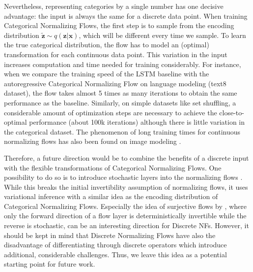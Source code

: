 Nevertheless, representing categories by a single number has one decisive advantage: the input is always the same for a discrete data point.
When training Categorical Normalizing Flows, the first step is to sample from the encoding distribution $\tilde{\bm{z}}\sim q(\bm{z}|\bm{x})$, which will be different every time we sample.
To learn the true categorical distribution, the flow has to model an (optimal) transformation for each continuous data point. 
This variation in the input increases computation and time needed for training considerably.
For instance, when we compare the training speed of the LSTM baseline with the autoregressive Categorical Normalizing Flow on language modeling (text8 dataset), the flow takes almost 5 times as many iterations to obtain the same performance as the baseline.
Similarly, on simple datasets like set shuffling, a considerable amount of optimization steps are necessary to achieve the close-to-optimal performance (about 100k iterations) although there is little variation in the categorical dataset. 
The phenomenon of long training times for continuous normalizing flows has also been found on image modeling \cite{VFlow, Flow++}.

Therefore, a future direction would be to combine the benefits of a discrete input with the flexible transformations of Categorical Normalizing Flows.
One possibility to do so is to introduce stochastic layers into the normalizing flows \cite{StochasticNF, SurVAE}.
While this breaks the initial invertibility assumption of normalizing flows, it uses variational inference with a similar idea as the encoding distribution of Categorical Normalizing Flows. 
Especially the idea of surjective flows by \citet{SurVAE}, where only the forward direction of a flow layer is deterministically invertible while the reverse is stochastic, can be an interesting direction for Discrete NFs.
However, it should be kept in mind that Discrete Normalizing Flows have also the disadvantage of differentiating through discrete operators which introduce additional, considerable challenges.
Thus, we leave this idea as a potential starting point for future work.

